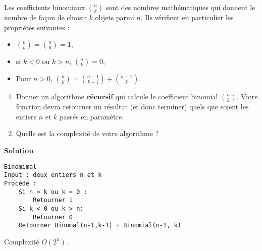 \begin{exercice}
Les coefficients binomiaux $\binom{n}{k}$ sont des nombres mathématiques qui donnent le nombre de façon de choisir
$k$ objets parmi $n$. Ils vérifient en particulier les propriétés suivantes :

\begin{itemize}
\item $\binom{n}{n} = \binom{n}{0} = 1$,
\item si $k < 0$ ou $k > n$, $\binom{n}{k} = 0$,
\item Pour $ n > 0$, $\binom{n}{k} = \binom{n-1}{k-1} + \binom{n-1}{k}$.
\end{itemize}

\begin{enumerate}
\item Donner un algorithme \textbf{récursif} qui calcule le coefficient binomial $\binom{n}{k}$. Votre fonction devra retourner un résultat (et donc terminer) quels que soient les entiers $n$ et $k$ passés en paramètre.

\item Quelle est la complexité de votre algorithme ?
\end{enumerate}

\textbf{Solution}

\begin{lstlisting}
Binomimal
Input : deux entiers n et k
Procédé :
    Si n = k ou k = 0 :
        Retourner 1
    Si k < 0 ou k > n:
        Retourner 0
    Retourner Binomal(n-1,k-1) + Binomial(n-1, k)
\end{lstlisting}

Complexité $O(2^n)$.

\end{exercice}